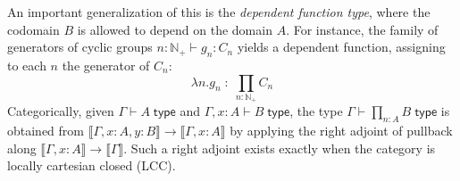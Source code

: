 \documentclass[12pt]{article}
\let\jdeq\equiv
\def\ty{\;\mathsf{type}}
\def\m#1{\llbracket#1\rrbracket}
\def\Np{\mathbb{N}_+}
\def\tprod{\textstyle\prod}
\def\types{\vdash}
\def\equiv{\mathsf{Equiv}}
\numberwithin{equation}{section}
\begin{document}
An important generalization of this is the \emph{dependent function type}, where the codomain $B$ is allowed to depend on the domain $A$.
For instance, the family of generators of cyclic groups $n:\Np \types g_n : C_n$ yields a dependent function, assigning to each $n$ the generator of $C_n$:
\[ \lambda n.g_n \;:\; \tprod_{n:\Np} C_n \]
Categorically, 
given $\Gamma\types A\ty$ and $\Gamma,x:A\types B\ty$, the type $\Gamma\types \tprod_{n:A} B \ty$ is obtained from $\m{\Gamma,x:A,y:B} \to \m{\Gamma,x:A}$ by applying the right adjoint of pullback along $\m{\Gamma,x:A} \to \m{\Gamma}$.
Such a right adjoint exists exactly when the category is locally cartesian closed (LCC).
\end{document}
